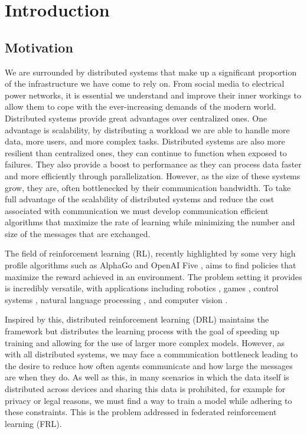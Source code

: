 \chapter{Introduction}

\section{Motivation}
We are surrounded by distributed systems that make up a significant proportion of the infrastructure we have come to rely on. 
From social media to electrical power networks, it is essential we understand and improve their inner workings to allow them to cope with the ever-increasing demands of the modern world. 
Distributed systems provide great advantages over centralized ones. 
One advantage is scalability, by distributing a workload we are able to handle more data, more users, and more complex tasks.
Distributed systems are also more resilient than centralized ones, they can continue to function when exposed to failures.
They also provide a boost to performance as they can process data faster and more efficiently through parallelization. 
However, as the size of these systems grow, they are, often bottlenecked by their communication bandwidth. To take full advantage of the scalability of distributed systems and reduce the cost associated with communication we must develop communication efficient algorithms that maximize the rate of learning while minimizing the number and size of the messages that are exchanged.

The field of reinforcement learning (RL), recently highlighted by some very high profile algorithms such as AlphaGo \cite{AlphaGo} and OpenAI Five \cite{OpenAIFive}, aims to find policies that maximize the reward achieved in an environment. The problem setting it provides is incredibly versatile, with applications including robotics \cite{TableTennis}, games \cite{AlphaStar}, control systems \cite{TriplePendulum}, natural language processing \cite{RLHF}, and computer vision \cite{Vision}. 

Inspired by this, distributed reinforcement learning (DRL) maintains the framework but distributes the learning process with the goal of speeding up training and allowing for the use of larger more complex models. However, as with all distributed systems, we may face a communication bottleneck leading to the desire to reduce how often agents communicate and how large the messages are when they do.
As well as this, in many scenarios in which the data itself is distributed across devices and sharing this data is prohibited, for example for privacy or legal reasons, we must find a way to train a model while adhering to these constraints. This is the problem addressed in federated reinforcement learning (FRL).

